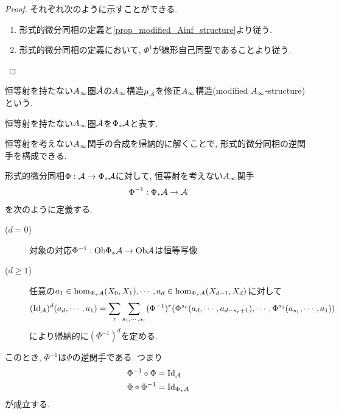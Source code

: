 \documentclass[uplatex, a4paper, 14Q, dvipdfmx]{jsarticle}
\begin{document}
\begin{proof}
  それぞれ次のように示すことができる. 
  \begin{enumerate}
    \item 形式的微分同相の定義と\cref{prop_modified_Ainf_structure}より従う. 
    \item 形式的微分同相の定義において, $\Phi^1$が線形自己同型であることより従う.
  \end{enumerate}
\end{proof}

\begin{definition}[修正$\Ainf$構造]
  恒等射を持たない$\Ainf$圏$\tilde{\mathcal{A}}$の$\Ainf$構造$\mu_{\tilde{\mathcal{A}}}$を修正$\Ainf$構造(modified $\Ainf$-structure)という.
\end{definition}

\begin{notation}
  恒等射を持たない$\Ainf$圏$\tilde{\mathcal{A}}$を$\Phi_\ast \mathcal{A}$と表す.
\end{notation}


恒等射を考えない$\Ainf$関手の合成を帰納的に解くことで, 形式的微分同相の逆関手を構成できる. 

\begin{lemma} \label{prop_diffeomorphism_has_inverse}
  形式的微分同相$\Phi: \mathcal{A} \to \Phi_\ast \mathcal{A}$に対して, 恒等射を考えない$\Ainf$関手
  \begin{align*}
    \Phi^{-1} : \Phi_\ast \mathcal{A} \to \mathcal{A}
  \end{align*}
  を次のように定義する.
  \begin{description}
    \item[($d=0$)] 対象の対応$\Phi^{-1} : \mathrm{Ob}\Phi_\ast \mathcal{A} \to \mathrm{Ob}\mathcal{A}$は恒等写像
    \item[($d \geq 1$)] 任意の$a_1 \in \hom_{\Phi_\ast \mathcal{A}}(X_0,X_1), \cdots, a_d \in \hom_{\Phi_\ast \mathcal{A}}(X_{d-1},X_d)$に対して
    \begin{align*}
      (\mathrm{Id}_{\mathcal{A}})^d (a_d,\cdots,a_1)
      = \sum_r \sum_{s_1,\cdots,s_r} (\Phi^{-1})^r(\Phi^{s_r} (a_d,\cdots,a_{d-s_r+1}), \cdots, \Phi^{s_1}(a_{s_1},\cdots,a_1))
    \end{align*}
    により帰納的に$(\Phi^{-1})^d$を定める.
  \end{description}
  このとき, $\Phi^{-1}$は$\Phi$の逆関手である. 
  つまり
  \begin{align*}
    \Phi^{-1} \circ \Phi &= \mathrm{Id}_{\mathcal{A}} \\
    \Phi \circ \Phi^{-1} &= \mathrm{Id}_{\Phi_\ast \mathcal{A}}
  \end{align*}
  が成立する. 
\end{lemma}
\end{document}
